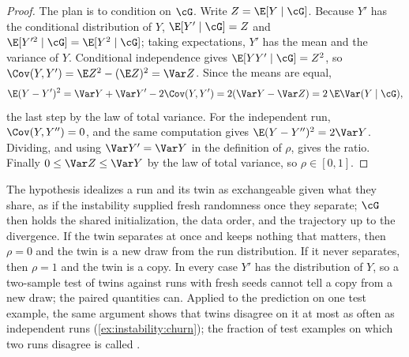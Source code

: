 \begin{refsection}

\begin{proof}
The plan is to condition on $\cG$. Write $Z=\E[Y\mid\cG]$. Because $Y'$ has the conditional distribution of $Y$, $\E[Y'\mid\cG]=Z$ and $\E[Y'^2\mid\cG]=\E[Y^2\mid\cG]$; taking expectations, $Y'$ has the mean and the variance of $Y$. Conditional independence gives $\E[YY'\mid\cG]=Z^2$, so $\Cov(Y,Y')=\E Z^2-(\E Z)^2=\Var Z$. Since the means are equal,
\[
  \E(Y-Y')^2=\Var Y+\Var Y'-2\Cov(Y,Y')=2(\Var Y-\Var Z)=2\,\E\Var(Y\mid\cG),
\]
the last step by the law of total variance. For the independent run, $\Cov(Y,Y'')=0$, and the same computation gives $\E(Y-Y'')^2=2\Var Y$. Dividing, and using $\Var Y'=\Var Y$ in the definition of $\rho$, gives the ratio. Finally $0\le\Var Z\le\Var Y$ by the law of total variance, so $\rho\in[0,1]$.
\end{proof}

The hypothesis idealizes a run and its twin as exchangeable given what they share, as if the instability supplied fresh randomness once they separate; $\cG$ then holds the shared initialization, the data order, and the trajectory up to the divergence. If the twin separates at once and keeps nothing that matters, then $\rho=0$ and the twin is a new draw from the run distribution. If it never separates, then $\rho=1$ and the twin is a copy. In every case $Y'$ has the distribution of $Y$, so a two-sample test of twins against runs with fresh seeds cannot tell a copy from a new draw; the paired quantities can. Applied to the prediction on one test example, the same argument shows that twins disagree on it at most as often as independent runs (\cref{ex:instability:churn}); the fraction of test examples on which two runs disagree is called  \parencite{MilaniFardEtAl2016}.


\end{refsection}
